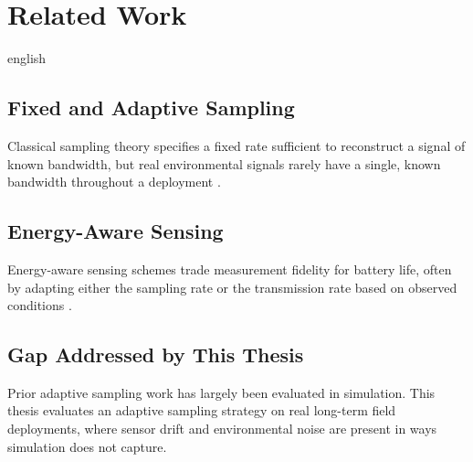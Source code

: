 \chapter{Related Work}
\label{chap-related}

\begin{otherlanguage*}{english}
\section{Fixed and Adaptive Sampling}
Classical sampling theory specifies a fixed rate sufficient to reconstruct
a signal of known bandwidth, but real environmental signals rarely have a
single, known bandwidth throughout a deployment \citep{Jain2004}.

\section{Energy-Aware Sensing}
Energy-aware sensing schemes trade measurement fidelity for battery life,
often by adapting either the sampling rate or the transmission rate based
on observed conditions \citep{Alippi2008}.

\section{Gap Addressed by This Thesis}
Prior adaptive sampling work has largely been evaluated in simulation.
This thesis evaluates an adaptive sampling strategy on real long-term
field deployments, where sensor drift and environmental noise are present
in ways simulation does not capture.
\end{otherlanguage*}
